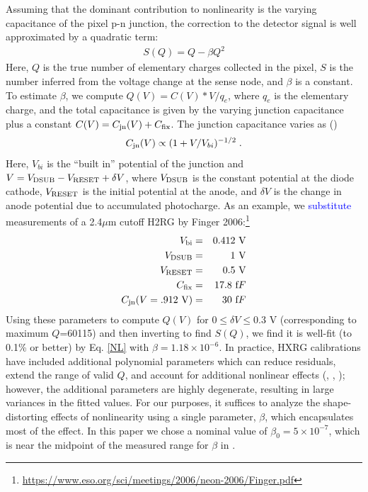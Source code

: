 \documentclass[preprint]{aastex}
\begin{document}
Assuming that the dominant contribution to nonlinearity is the varying capacitance of the pixel p-n junction, the correction to the detector signal is well approximated by a quadratic term:
\begin{align}
S(Q)= Q - \beta Q ^2
\label{NL}
\end{align}
Here, $Q$ is the true number of elementary charges collected in the pixel, $S$ is the number inferred from the voltage change at the sense node, and $\beta$ is a constant.  To estimate $\beta$, we compute $Q(V)=C(V)*V/q_e$, where $q_e$ is the elementary charge, and the total capacitance is given by the varying junction capacitance plus a constant $C(V) = C_{\rm jn}(V) + C_{\rm fix}$. The junction capacitance varies as (\citealt{mccaughrean87})
\begin{equation}
C_{\rm jn}(V) \propto (1+V/V_{bi})^{-1/2} \;.
\end{equation}
Here, $V_{bi}$ is the ``built in'' potential of the junction and $V=V_{\rm DSUB}-V_{\rm RESET}+\delta V$, where $V_{\rm DSUB}$ is the constant potential at the diode cathode, $V_{\rm RESET}$ is the initial potential at the anode, and $\delta V$ is the change in anode potential due to accumulated photocharge.  As an example, we \textcolor{blue}{substitute} measurements of a 2.4$\mu$m cutoff H2RG by Finger 2006:\footnote{\url{https://www.eso.org/sci/meetings/2006/neon-2006/Finger.pdf}}
\begin{eqnarray*}
V_{\rm bi} &=& 0.412\ {\mbox V} \\
V_{\rm DSUB} &=& 1\ {\mbox V} \\
V_{\rm RESET} &=& 0.5\ {\mbox V} \\
C_{\rm fix} &=& 17.8\ {\mbox fF} \\
C_{\rm jn}(V=.912\ {\mbox V}) &=& 30\ {\mbox fF}
\end{eqnarray*}
Using these parameters to compute $Q(V)$ for $ 0\le \delta V \le 0.3$ V (corresponding to maximum $Q$=60115) and then inverting to find $S(Q)$, we find it is well-fit (to 0.1\% or better) by Eq. \ref{NL} with $\beta=1.18 \times 10^{-6}$. In practice, HXRG calibrations have included additional polynomial parameters which can reduce residuals, extend the range of valid $Q$, and account for additional nonlinear effects (\citealt{hilbert04}, \citealt{hilbert08}, \citealt{hilbert14}); however, the additional parameters are highly degenerate, resulting in large variances in the fitted values.  For our purposes, it suffices to analyze the shape-distorting effects of nonlinearity using a single parameter, $\beta$, which encapsulates most of the effect. In this paper we chose a nominal value of $\beta_0=5\times 10^{-7}$, which is near the midpoint of the measured range for $\beta$ in \citealt{hilbert14}. 
\end{document}
